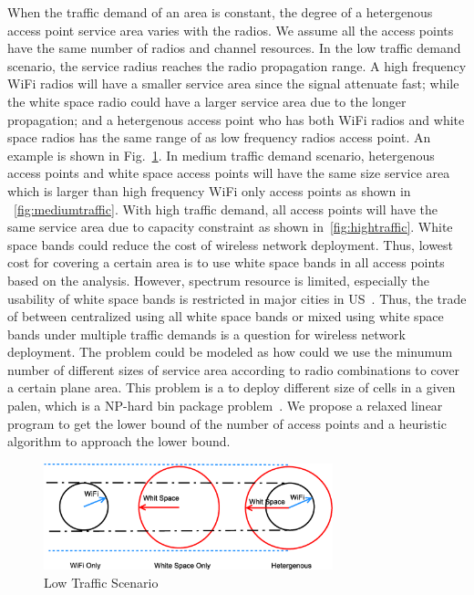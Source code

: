 When the traffic demand of an area is constant, the degree of a hetergenous access point service area 
varies with the radios. We assume all the access points have the same number of radios and channel 
resources.
In the low traffic demand scenario, the service radius reaches the radio propagation range.
A high frequency WiFi radios will have a smaller service area since the signal attenuate fast; while the white
space radio could have a larger service area due to the longer propagation; and a hetergenous access point who has
both WiFi radios and white space radios has the same range of as low frequency radios access point. An example is
shown in Fig.~\ref{fig:lowtraffic}.
In medium traffic demand scenario, hetergenous access points and white space access points will 
have the same size service area which is larger than high frequency WiFi only access points as shown in 
~\ref{fig:mediumtraffic}.
With high traffic demand, all access points will have the same service area due to capacity constraint 
as shown in~\ref{fig:hightraffic}. White space bands could reduce the cost of wireless network deployment. 
Thus, lowest cost for covering a certain area is to use white space bands in all access points 
based on the analysis. However, spectrum resource is limited, especially the usability
of white space bands is restricted in major cities in US~\cite{msdatabase}. 
Thus, the trade of between centralized using all white space bands or mixed using white space
bands under multiple traffic demands is a question for wireless network deployment. The problem
could be modeled as how could we use the minumum number of different sizes of service area according to 
radio combinations to cover a certain plane area. This problem is a to deploy different size of cells in 
a given palen, which is a NP-hard bin package problem~\cite{martello1998exact}. We propose a relaxed 
linear program to get the lower bound of the number of access points and a heuristic algorithm to 
approach the lower bound.



\begin{figure}[h]
\centering
\includegraphics[width=84mm]{figures/lowtraffic}
\vspace{-0.1in}
\caption{Low Traffic Scenario}                                                                 
\label{fig:lowtraffic}
\vspace{-0.1in}
\end{figure}

